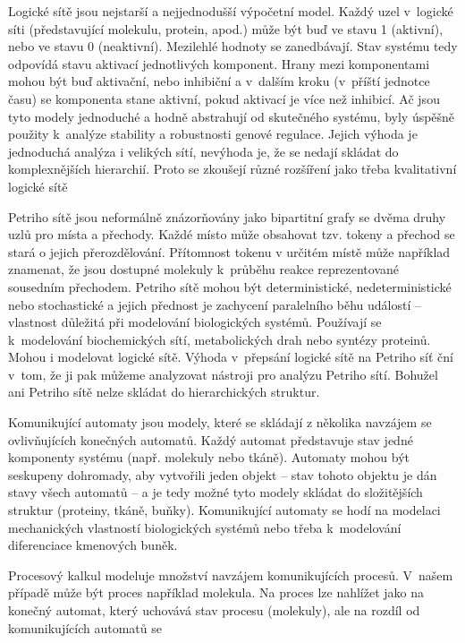 \documentclass[a4paper]{article}
\begin{document}
\par
Logické sítě jsou nejstarší a nejjednodušší výpočetní
model. Každý uzel v~logické síti (představující molekulu, protein, apod.) může být
buď ve stavu 1 (aktivní), nebo ve stavu 0 (neaktivní). Mezilehlé hodnoty se zanedbávají.
Stav systému tedy odpovídá stavu aktivací jednotlivých komponent. Hrany mezi komponentami
mohou být buď aktivační, nebo inhibiční a v~dalším kroku (v~příští jednotce času)
se komponenta stane aktivní, pokud aktivací je více než inhibicí. Ač jsou tyto modely
jednoduché a hodně abstrahují od skutečného systému, byly úspěšně použity
k~analýze stability a robustnosti genové regulace\cite{Fisher}. Jejich výhoda je jednoduchá analýza
i velikých sítí, nevýhoda je, že se nedají skládat do komplexnějších hierarchií. Proto
se zkoušejí různé rozšíření jako třeba kvalitativní logické sítě\cite{Shaub}
\par
Petriho sítě jsou neformálně znázorňovány jako bipartitní grafy se dvěma druhy uzlů pro
místa a přechody. Každé místo může obsahovat tzv. tokeny a přechod se stará o jejich přerozdělování.
Přítomnost tokenu v určitém místě může například znamenat, že jsou dostupné molekuly k~průběhu reakce
reprezentované sousedním přechodem. Petriho sítě mohou být deterministické, nedeterministické
nebo stochastické a
jejich přednost je zachycení paralelního běhu událostí -- vlastnost důležitá při modelování
biologických systémů. Používají se k~modelování biochemických sítí, metabolických drah
nebo syntézy proteinů. Mohou i modelovat logické sítě. Výhoda v~přepsání logické sítě
na Petriho síť ční v~tom, že ji pak můžeme analyzovat nástroji pro analýzu Petriho sítí.
Bohužel ani Petriho sítě nelze skládat do hierarchických struktur.
\par
Komunikující automaty jsou modely, které se skládají z několika navzájem se ovlivňujících
konečných automatů. Každý automat představuje stav jedné komponenty systému (např. molekuly nebo tkáně).
Automaty mohou být seskupeny dohromady, aby vytvořili jeden objekt -- stav tohoto objektu
je dán stavy všech automatů -- a je tedy možné tyto modely skládat do složitějších struktur
(proteiny, tkáně, buňky). Komunikující automaty se hodí na modelaci mechanických vlastností
biologických systémů nebo třeba k~modelování diferenciace kmenových buněk\cite{Fisher}.
\par
Procesový kalkul modeluje množství navzájem komunikujících procesů.
V~našem případě může být proces například molekula. Na proces lze nahlížet jako na konečný automat,
který uchovává stav procesu (molekuly), ale na rozdíl od komunikujících automatů se
\end{document}
